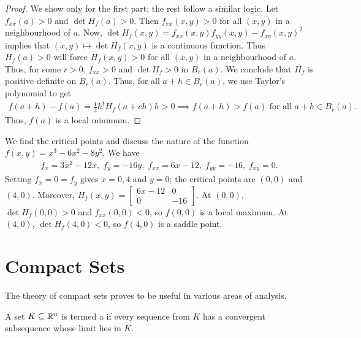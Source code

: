 \begin{proof}
    We show only for the first part; the rest follow a similar logic. Let $f_{xx}(a) > 0$ and $\det H_{f}(a) > 0$. Then $f_{xx}(x,y) > 0$ for all $(x,y)$ in a neighbourhood of $a$. Now, $\det H_{f}(x,y) = f_{xx}(x,y)f_{yy}(x,y)-f_{xy}(x,y)^{2}$ implies that $(x,y) \mapsto \det H_{f}(x,y)$ is a continuous function. Thus $H_{f}(a) > 0$ will force $H_{f}(x,y) > 0$ for all $(x,y)$ in a neighbourhood of $a$. Thus, for some $r > 0$, $f_{xx} > 0$ and $\det H_{f} > 0$ in $B_{r}(a)$. We conclude that $H_{f}$ is positive definite on $B_{r}(a)$. Thus, for all $a + h \in B_{r}(a)$, we use Taylor's polynomial to get
    \begin{align}
        f(a+h)-f(a) = \frac{1}{2}h^{t}H_{f}(a+ch)h > 0 \implies f(a+h) > f(a) \text{ for all } a+h \in B_{r}(a).
    \end{align}
    Thus, $f(a)$ is a local minimum.
\end{proof}

\begin{example}
    We find the critical points and discuss the nature of the function $f(x,y) = x^{3}-6x^{2}-8y^{2}$. We have
    \begin{align}
        f_{x} = 3x^{2}-12x,\;f_{y}=-16y,\;f_{xx}=6x-12,\;f_{yy}=-16,\;f_{xy}=0.
    \end{align}
    Setting $f_{x} = 0 = f_{y}$ gives $x = 0,4$ and $y = 0$; the critical points are $(0,0)$ and $(4,0)$. Moreover, $H_{f}(x,y) = \begin{bmatrix}
        6x-12 & 0 \\ 0 & -16
    \end{bmatrix}$. At $(0,0)$, $\det H_{f}(0,0) > 0$ and $f_{xx}(0,0) < 0$, so $f(0,0)$ is a local maximum. At $(4,0)$, $\det H_{f}(4,0) < 0$, so $f(4,0)$ is a saddle point.
\end{example}

\section{Compact Sets}

The theory of compact sets proves to be useful in various areas of analysis.

\begin{definition}
    A set $K \subseteq \mathbb{R}^{n}$ is termed a  if every sequence from $K$ has a convergent subsequence whose limit lies in $K$.
\end{definition}

